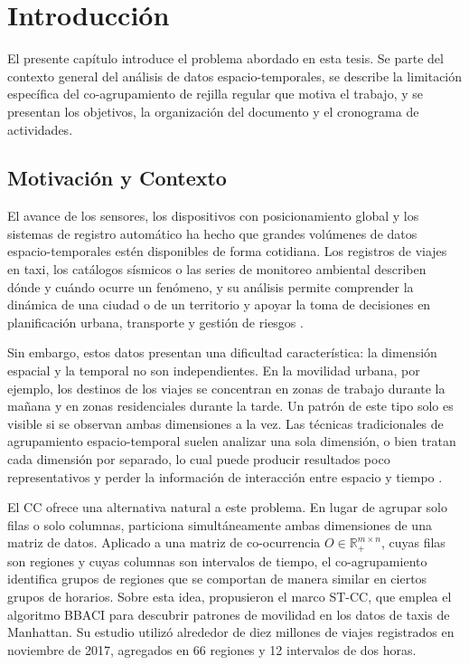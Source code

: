 
\chapter{Introducción}
\label{chap:introduccion}

El presente capítulo introduce el problema abordado en esta tesis. Se parte
del contexto general del análisis de datos espacio-temporales, se describe
la limitación específica del co-agrupamiento de rejilla regular que motiva
el trabajo, y se presentan los objetivos, la organización del documento y
el cronograma de actividades.

\section{Motivación y Contexto}
\label{sec:motivacion}

El avance de los sensores, los dispositivos con posicionamiento global y
los sistemas de registro automático ha hecho que grandes volúmenes de datos
espacio-temporales estén disponibles de forma cotidiana. Los registros de
viajes en taxi, los catálogos sísmicos o las series de monitoreo ambiental
describen dónde y cuándo ocurre un fenómeno, y su análisis
permite comprender la dinámica de una ciudad o de un territorio y apoyar la
toma de decisiones en planificación urbana, transporte y gestión de riesgos
\cite{Liu2021}.

Sin embargo, estos datos presentan una dificultad característica: la
dimensión espacial y la temporal no son independientes. En la movilidad
urbana, por ejemplo, los destinos de los viajes se concentran en zonas de
trabajo durante la mañana y en zonas residenciales durante la tarde. Un
patrón de este tipo solo es visible si se observan ambas dimensiones a la
vez. Las técnicas tradicionales de agrupamiento espacio-temporal suelen
analizar una sola dimensión, o bien tratan cada dimensión por separado, lo
cual puede producir resultados poco representativos y perder la información
de interacción entre espacio y tiempo \cite{Liu2021}.

El \ac{CC} ofrece una alternativa natural a este problema. En lugar de
agrupar solo filas o solo columnas, particiona simultáneamente ambas
dimensiones de una matriz de datos. Aplicado a una matriz de co-ocurrencia
$O \in \mathbb{R}_{+}^{m \times n}$, cuyas filas son regiones y cuyas
columnas son intervalos de tiempo, el co-agrupamiento identifica grupos de
regiones que se comportan de manera similar en ciertos grupos de horarios.
Sobre esta idea, \cite{Liu2021} propusieron el marco \ac{ST-CC}, que emplea
el algoritmo \ac{BBACI} \cite{Banerjee2007} para descubrir patrones de
movilidad en los datos de taxis de Manhattan. Su estudio utilizó alrededor
de diez millones de viajes registrados en noviembre de 2017, agregados en
66 regiones y 12 intervalos de dos horas.

